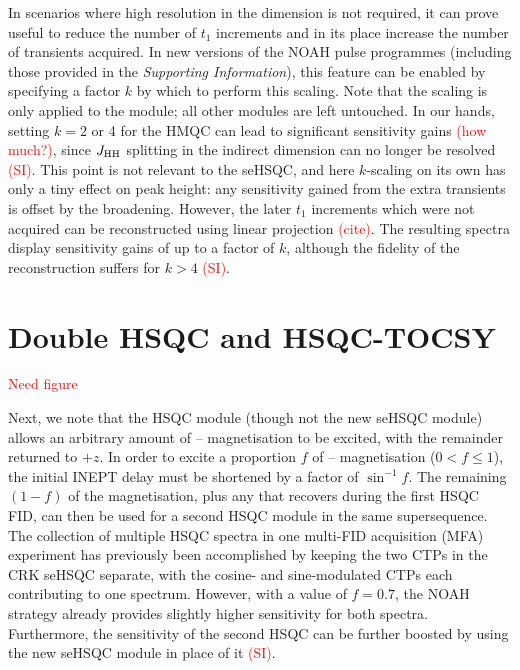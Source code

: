 \documentclass[11pt]{article}
\newcommand*{\carbon}{\ce{^{13}C}}
\newcommand*{\proton}{\ce{^{1}H}}
\newcommand*{\nitrogen}{\ce{^{15}N}}
\newcommand*{\red}[1]{\textcolor{red}{#1}}
\newcommand*{\jhh}{J_{\ce{HH}}}
\newcommand*{\SInf}{\textit{Supporting Information}}
\newcommand*{\sitodo}{\red{(SI)}}
\begin{document}
In scenarios where high resolution in the \nitrogen{} dimension is not required, it can prove useful to reduce the number of $t_1$ increments and in its place increase the number of transients acquired.\autocite{Perez-Trujillo2007MRC, Parella2010CMR}
In new versions of the NOAH pulse programmes (including those provided in the \SInf{}), this feature can be enabled by specifying a factor $k$ by which to perform this scaling.
Note that the scaling is only applied to the \nitrogen{} module; all other modules are left untouched.
In our hands, setting $k = 2$ or 4 for the \nitrogen{} HMQC can lead to significant sensitivity gains \red{(how much?)}, since $\jhh$ splitting in the indirect dimension can no longer be resolved \sitodo{}.
This point is not relevant to the seHSQC, and here $k$-scaling on its own has only a tiny effect on peak height: any sensitivity gained from the extra transients is offset by the broadening.
However, the later $t_1$ increments which were not acquired can be reconstructed using linear projection \red{(cite)}.
The resulting spectra display sensitivity gains of up to a factor of $k$, although the fidelity of the reconstruction suffers for $k > 4$ \sitodo.

\section*{Double HSQC and HSQC-TOCSY}

\red{Need figure}

Next, we note that the HSQC module (though not the new seHSQC module) allows an arbitrary amount of \carbon{}--\proton{} magnetisation to be excited, with the remainder returned to $+z$.  In order to excite a proportion $f$ of \carbon{}--\proton{} magnetisation ($0 < f \leq 1$), the initial INEPT delay must be shortened by a factor of $\sin^{-1}f$.
The remaining $(1 - f)$ of the magnetisation, plus any that recovers during the first HSQC FID, can then be used for a second HSQC module in the same supersequence.
The collection of multiple HSQC spectra in one multi-FID acquisition (MFA) experiment has previously been accomplished by keeping the two CTPs in the CRK seHSQC separate, with the cosine- and sine-modulated CTPs each contributing to one spectrum.\autocite{ctphsqc}
However, with a value of $f = 0.7$, the NOAH strategy already provides slightly higher sensitivity for both spectra.
Furthermore, the sensitivity of the second HSQC can be further boosted by using the new seHSQC module in place of it \sitodo{}.
\end{document}
